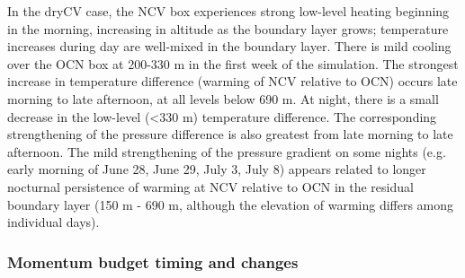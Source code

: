 In the dryCV case, the NCV box experiences strong low-level heating beginning in the morning, increasing in altitude as the boundary layer grows; temperature increases during day are well-mixed in the boundary layer.  There is mild cooling over the OCN box at 200-330 m in the first week of the simulation.  The strongest increase in temperature difference (warming of NCV relative to OCN) occurs late morning to late afternoon, at all levels below 690 m.  At night, there is a small decrease in the low-level (\textless 330 m) temperature difference.  The corresponding strengthening of the pressure difference is also greatest from late morning to late afternoon.  The mild strengthening of the pressure gradient on some nights (e.g. early morning of June 28, June 29, July 3, July 8) appears related to longer nocturnal persistence of warming at NCV relative to OCN in the residual boundary layer (150 m - 690 m, although the elevation of warming differs among individual days).

\subsubsection{Momentum budget timing and changes}

